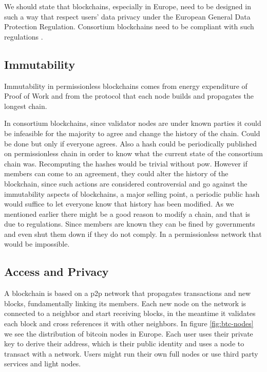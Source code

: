 We should state that blockchains, especially in Europe, need to be designed in such a way that respect users' data privacy under the European General Data Protection Regulation. Consortium blockchains need to be compliant with such regulations \cite{gdpr}.

\subsection{Immutability}
Immutability in permissionless blockchains comes from energy expenditure of Proof of Work and from the protocol that each node builds and propagates the longest chain.

In consortium blockchains, since validator nodes are under known parties it could be infeasible for the majority to agree and change the history of the chain. Could be done but only if everyone agrees. Also a hash could be periodically published on permissionless chain in order to know what the current state of the consortium chain was. Recomputing the hashes would be trivial without \gls{pow}. However if members can come to an agreement, they could alter the history of the blockchain, since such actions are considered controversial and go against the immutability aspects of blockchains, a major selling point, a periodic public hash would suffice to let everyone know that history has been modified. As we mentioned earlier there might be a good reason to modify a chain, and that is due to regulations. Since members are known they can be fined by governments and even shut them down if they do not comply. In a permissionless network that would be impossible.

\subsection{Access and Privacy}
A blockchain is based on a \acrshort{p2p} network that propagates transactions and new blocks, fundamentally linking its members. Each new node on the network is connected to a neighbor and start receiving blocks, in the meantime it validates each block and cross references it with other neighbors.  In figure \ref{fig:btc-nodes} we see the distribution of bitcoin nodes in Europe. Each user uses their private key to derive their address, which is their public identity and uses a node to transact with a network. Users might run their own full nodes or use third party services and light nodes. 

